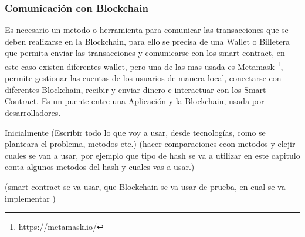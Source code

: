 \subsubsection{Comunicación con Blockchain}
Es necesario un metodo o herramienta para comunicar las transacciones que se deben realizarse 
en la Blockchain, para ello se precisa de una Wallet o Billetera que permita enviar las transacciones 
y comunicarse con los smart contract, en este caso existen diferentes wallet, pero una de las mas usada
es Metamask \footnote{\url{https://metamask.io/}}, permite gestionar las cuentas de los usuarios de manera local, conectarse con diferentes Blockchain, 
recibir y enviar dinero e interactuar con los Smart Contract.
Es un puente entre una Aplicación y la Blockchain, usada por desarrolladores. \cite[]{dannen_introducing_2017,metamask_introduction_2021}

 








Inicialmente 
(Escribir todo lo que voy a usar, desde tecnologías, como se planteara el problema, metodos etc.)
(hacer comparaciones econ metodos y elejir cuales se van a usar, por ejemplo que tipo de hash se va a utilizar
en este capitulo conta algunos metodos del hash y cuales vas a usar.)

(smart contract se va usar, que  Blockchain se va  usar de prueba, en cual se va implementar )







